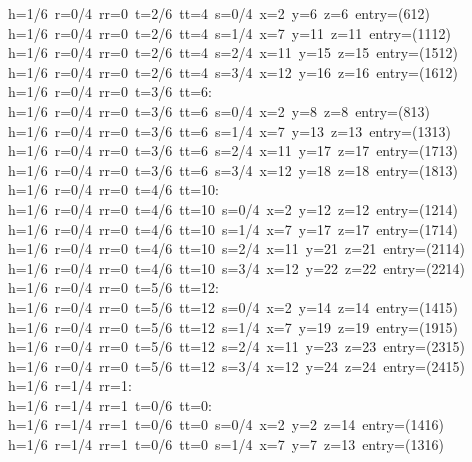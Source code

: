\begin{tabbing}
h=1/6\ r=0/4\ rr=0\ t=2/6\ tt=4\ s=0/4\ x=2\ y=6\ z=6\ entry=(612)\\[0pt]
h=1/6\ r=0/4\ rr=0\ t=2/6\ tt=4\ s=1/4\ x=7\ y=11\ z=11\ entry=(1112)\\[0pt]
h=1/6\ r=0/4\ rr=0\ t=2/6\ tt=4\ s=2/4\ x=11\ y=15\ z=15\ entry=(1512)\\[0pt]
h=1/6\ r=0/4\ rr=0\ t=2/6\ tt=4\ s=3/4\ x=12\ y=16\ z=16\ entry=(1612)\\[0pt]
h=1/6\ r=0/4\ rr=0\ t=3/6\ tt=6:\\[0pt]
h=1/6\ r=0/4\ rr=0\ t=3/6\ tt=6\ s=0/4\ x=2\ y=8\ z=8\ entry=(813)\\[0pt]
h=1/6\ r=0/4\ rr=0\ t=3/6\ tt=6\ s=1/4\ x=7\ y=13\ z=13\ entry=(1313)\\[0pt]
h=1/6\ r=0/4\ rr=0\ t=3/6\ tt=6\ s=2/4\ x=11\ y=17\ z=17\ entry=(1713)\\[0pt]
h=1/6\ r=0/4\ rr=0\ t=3/6\ tt=6\ s=3/4\ x=12\ y=18\ z=18\ entry=(1813)\\[0pt]
h=1/6\ r=0/4\ rr=0\ t=4/6\ tt=10:\\[0pt]
h=1/6\ r=0/4\ rr=0\ t=4/6\ tt=10\ s=0/4\ x=2\ y=12\ z=12\ entry=(1214)\\[0pt]
h=1/6\ r=0/4\ rr=0\ t=4/6\ tt=10\ s=1/4\ x=7\ y=17\ z=17\ entry=(1714)\\[0pt]
h=1/6\ r=0/4\ rr=0\ t=4/6\ tt=10\ s=2/4\ x=11\ y=21\ z=21\ entry=(2114)\\[0pt]
h=1/6\ r=0/4\ rr=0\ t=4/6\ tt=10\ s=3/4\ x=12\ y=22\ z=22\ entry=(2214)\\[0pt]
h=1/6\ r=0/4\ rr=0\ t=5/6\ tt=12:\\[0pt]
h=1/6\ r=0/4\ rr=0\ t=5/6\ tt=12\ s=0/4\ x=2\ y=14\ z=14\ entry=(1415)\\[0pt]
h=1/6\ r=0/4\ rr=0\ t=5/6\ tt=12\ s=1/4\ x=7\ y=19\ z=19\ entry=(1915)\\[0pt]
h=1/6\ r=0/4\ rr=0\ t=5/6\ tt=12\ s=2/4\ x=11\ y=23\ z=23\ entry=(2315)\\[0pt]
h=1/6\ r=0/4\ rr=0\ t=5/6\ tt=12\ s=3/4\ x=12\ y=24\ z=24\ entry=(2415)\\[0pt]
h=1/6\ r=1/4\ rr=1:\\[0pt]
h=1/6\ r=1/4\ rr=1\ t=0/6\ tt=0:\\[0pt]
h=1/6\ r=1/4\ rr=1\ t=0/6\ tt=0\ s=0/4\ x=2\ y=2\ z=14\ entry=(1416)\\[0pt]
h=1/6\ r=1/4\ rr=1\ t=0/6\ tt=0\ s=1/4\ x=7\ y=7\ z=13\ entry=(1316)\\[0pt]

\end{tabbing}
